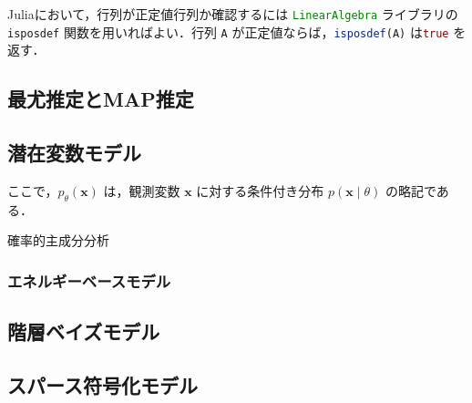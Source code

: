 \documentclass[titlepage]{ltjsbook}
\newcommand{\jl}{\lstinline[language=julia]}
\begin{document}
Juliaにおいて，行列が正定値行列か確認するには \jl{LinearAlgebra} ライブラリの \jl{isposdef} 関数を用いればよい．行列 \jl{A} が正定値ならば，\jl{isposdef(A)} は\jl{true} を返す．

\subsection{最尤推定とMAP推定}

\subsection{潜在変数モデル}
ここで，$p_\theta(\mathbf{x})$ は，観測変数 $\mathbf{x}$ に対する条件付き分布 $p(\mathbf{x} \mid \theta)$ の略記である．

確率的主成分分析
\subsubsection{エネルギーベースモデル}

\subsection{階層ベイズモデル}

\subsection{スパース符号化モデル}
\end{document}
